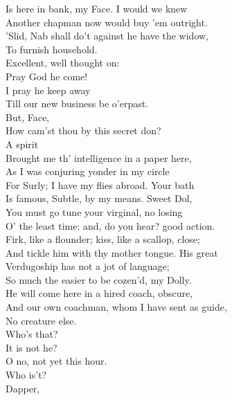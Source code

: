 \documentclass[a4paper,oneside]{memoir}
\begin{document}
\begin{drama*}
Is here in bank, my Face. I would we knew\\
Another chapman now would buy 'em outright.\\
\facespeaks 'Slid, Nab shall do't against he have the widow,\\
To furnish household.\\
\subtlespeaks {} Excellent, well thought on:\\
Pray God he come!\\
\facespeaks {} I pray he keep away\\
Till our new business be o'erpast.\\
\subtlespeaks {} But, Face,\\
How cam'st thou by this secret don?\\
\facespeaks {} A spirit\\
Brought me th' intelligence in a paper here,\\
As I was conjuring yonder in my circle\\
For Surly; I have my flies abroad. Your bath\\
Is famous, Subtle, by my means. Sweet Dol,\\
You must go tune your virginal, no losing\\
O' the least time: and, do you hear? good action.\\
Firk, like a flounder; kiss, like a scallop, close;\\
And tickle him with thy mother tongue. His great\\
Verdugoship has not a jot of language;\\
So much the easier to be cozen'd, my Dolly.\\
He will come here in a hired coach, obscure,\\
And our own coachman, whom I have sent as guide,\\
No creature else.\\
 Who's that?\\
\subtlespeaks {} It is not he?\\
\facespeaks O no, not yet this hour.\\
\subtlespeaks {} Who is't?\\
\dolspeaks {} Dapper,\\

\end{drama*}
\end{document}
